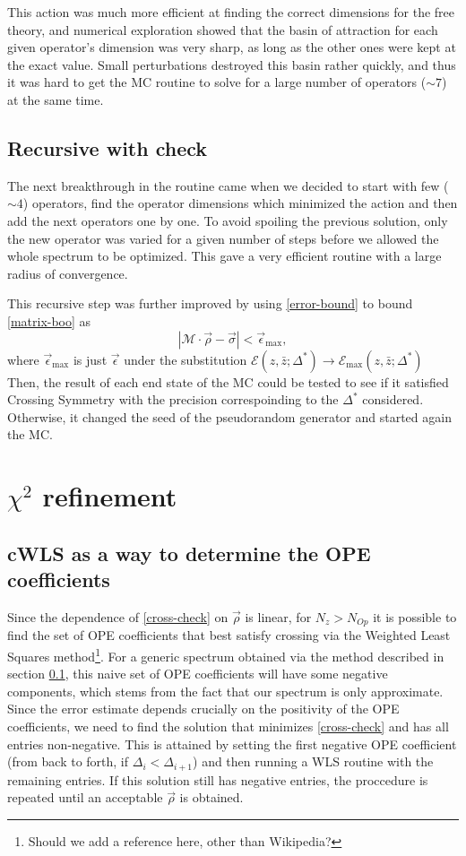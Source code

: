 \documentclass[letterpaper]{article}
\numberwithin{equation}{section}
\begin{document}
This action was much more efficient at finding the correct dimensions for the
free theory, and numerical exploration showed that the basin of attraction for
each given operator's dimension was very sharp, as long as the other ones were
kept at the exact value. Small perturbations destroyed this basin rather
quickly, and thus it was hard to get the MC routine to solve for a large number
of operators  ($\sim 7$) at the same time.

\subsection{Recursive with check}
\label{rec-check}

The next breakthrough in the routine came when we decided to start with few
($\sim 4$) operators, find the operator dimensions which minimized the 
action and then add the next operators one by one. To avoid spoiling
the previous solution, only the new operator was varied for a given number of
steps before we allowed the whole spectrum to be optimized. This gave a very
efficient routine with a large radius of convergence.

This recursive step was further improved by using
\ref{error-bound} to bound \ref{matrix-boo} as 
\begin{equation}
  | \mathcal{M}\cdot \vec{\rho}-\vec{\sigma} | < \vec{\epsilon}_{\mathrm{max}},
  \label{cross-check}
\end{equation}
where $\vec \epsilon _{\mathrm{max}}$ is just $\vec \epsilon$ under the
substitution $\mathcal{E}(z,\bar z; \Delta^*)\to\mathcal{E}_{\mathrm{max}}(z,\bar z; \Delta^*)$
Then, the result of each end state of the MC could be tested to see if it
satisfied Crossing Symmetry with the precision correspoinding to the $\Delta^*$
considered. Otherwise, it changed the seed of the pseudorandom generator and
started again the MC.


\section{$\chi^2$ refinement}
\subsection{cWLS as a way to determine the OPE coefficients}
Since the dependence of \ref{cross-check} on $\vec{\rho}$ is linear, for
$N_z>N_{Op}$ it is possible to find the set of OPE coefficients that best
satisfy crossing via the Weighted Least Squares method\footnote{Should we add a
reference here, other than Wikipedia?}. 
For a generic spectrum
obtained via the method described in section \ref{rec-check}, this naive set of OPE
coefficients will have some negative components, which stems from the
fact that our spectrum is only approximate. Since the error estimate
\label{finalest4}
depends
crucially on the positivity of the OPE coefficients, we need to find the
solution that minimizes \ref{cross-check} and has all entries non-negative. This
is attained by setting the first negative OPE coefficient (from back to forth,
if $\Delta_i<\Delta_{i+1}$) and then running a WLS routine with the remaining
entries. If this solution still has negative entries, the proccedure is repeated
until an acceptable $\vec{\rho}$ is obtained.
\end{document}
